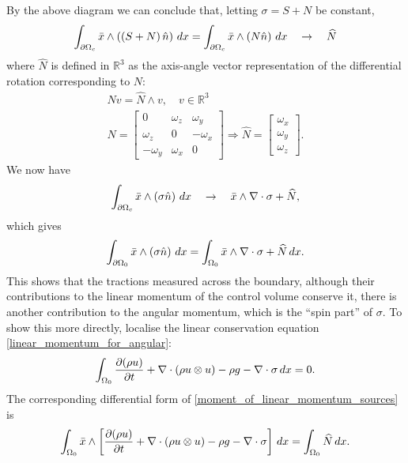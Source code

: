 By the above diagram we can conclude that, letting $\sigma = S + N$ be constant,
\begin{align*}
    \int_{{\partial\Omega}_c} \bar{x} \wedge \left(\left(S + N\right)\hat{n}\right)\,dx
    =
    \int_{{\partial\Omega}_c} \bar{x} \wedge \left(N\hat{n}\right)\,dx
    \quad\rightarrow\quad
    \widehat{N}
\end{align*}
where $\widehat{N}$ is defined in $\mathbb{R}^3$ as the axis-angle vector representation of the differential rotation corresponding to $N$:
\begin{equation}
\begin{split}
    Nv = \widehat{N}\wedge v,\quad v\in\mathbb{R}^3
    \\
    N = \begin{bmatrix}
        0 & \omega_z & \omega_y \\ \omega_z & 0 & -\omega_x  \\ -\omega_y & \omega_x & 0
    \end{bmatrix} \Rightarrow \widehat{N} = \begin{bmatrix} \omega_x \\ \omega_y \\ \omega_z \end{bmatrix}.
\end{split}
\end{equation}
We now have
\begin{equation}
    \int_{{\partial\Omega}_c} \bar{x}\wedge\left(\sigma\hat{n}\right)\,dx \quad\rightarrow\quad
    \bar{x}\wedge \nabla\cdot \sigma + \widehat{N},
\end{equation}
which gives 
\begin{equation}
    \int_{{\partial\Omega_0}} \bar{x} \wedge \left(\sigma\hat{n}\right)\,dx = \int_{\Omega_0} \bar{x}\wedge\nabla\cdot\sigma + \widehat{N}\,dx.
\end{equation}
This shows that the tractions measured across the boundary, although their contributions to the linear momentum of the control volume conserve it,
there is another contribution to the angular momentum, which is the ``spin part'' of $\sigma$.
To show this more directly, localise the linear conservation equation \eqref{linear_momentum_for_angular}:
\begin{equation}\label{linear_momentum_for_angular_localised}
    \int_{{\Omega_0}} \frac{\partial (\rho u)}{\partial t} + \nabla\cdot\left(\rho u\otimes u\right) - \rho g - \nabla\cdot\sigma\,dx = 0.
\end{equation}
The corresponding differential form of \eqref{moment_of_linear_momentum_sources} is
\begin{equation}\label{moment_of_linear_momentum_sources_localised}
    \int_{{\Omega_0}} \bar{x} \wedge \left[\frac{\partial (\rho u)}{\partial t} + \nabla\cdot\left(\rho u\otimes u\right) - \rho g - \nabla\cdot\sigma\right]\,dx
    = \int_{\Omega_0} \widehat{N}\,dx.
\end{equation}
